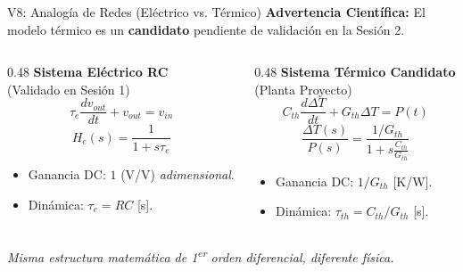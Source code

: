 \documentclass[aspectratio=169, xcolor={table,xcdraw}]{beamer}
\begin{document}
\begin{frame}{V8: Analogía de Redes (Eléctrico vs. Térmico)}
    \textbf{Advertencia Científica:} El modelo térmico es un \textbf{candidato} pendiente de validación en la Sesión 2.
    
    \vspace{0.2cm}
    \begin{columns}[T]
        \begin{column}{0.48\textwidth}
            \centering
            \textbf{Sistema Eléctrico RC} \\
            (Validado en Sesión 1)
            \begin{equation*}
                \tau_e \frac{dv_{out}}{dt} + v_{out} = v_{in}
            \end{equation*}
            \begin{equation*}
                H_e(s) = \frac{1}{1 + s\tau_e}
            \end{equation*}
            \begin{itemize}
                \item Ganancia DC: $1$ (V/V) \textit{adimensional}.
                \item Dinámica: $\tau_e = RC$ [s].
            \end{itemize}
        \end{column}
        \begin{column}{0.48\textwidth}
            \centering
            \textbf{Sistema Térmico Candidato} \\
            (Planta Proyecto)
            \begin{equation*}
                C_{th} \frac{d\Delta T}{dt} + G_{th}\Delta T = P(t)
            \end{equation*}
            \begin{equation*}
                \frac{\Delta T(s)}{P(s)} = \frac{1/G_{th}}{1 + s \frac{C_{th}}{G_{th}}}
            \end{equation*}
            \begin{itemize}
                \item Ganancia DC: $1/G_{th}$ [K/W].
                \item Dinámica: $\tau_{th} = C_{th}/G_{th}$ [s].
            \end{itemize}
        \end{column}
    \end{columns}
    \vspace{0.2cm}
    \centering
    \textit{Misma estructura matemática de 1\textsuperscript{er} orden diferencial, diferente física.}
\end{frame}
\end{document}

